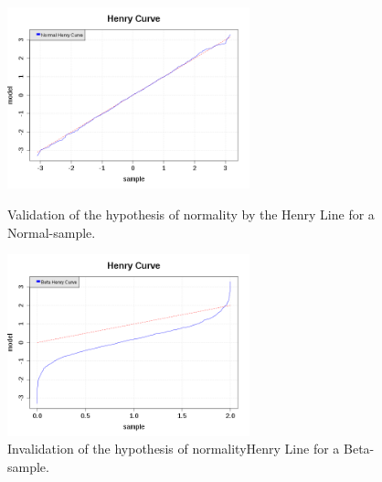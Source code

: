              \begin{figure}[H]
               \begin{minipage}{10cm}
                 \begin{center}
                   \includegraphics[width=7cm]{Figures/HenryLineTestRight.png}
                   \caption{Validation of the hypothesis of normality by the Henry Line for a Normal-sample.}
                   \label{henryLineExRight}
                 \end{center}
               \end{minipage}
               \hfill
               \begin{minipage}{10cm}
                 \begin{center}
                   \includegraphics[width=7cm]{Figures/HenryLineTestFalse.png}
                   \caption{Invalidation of the hypothesis of normalityHenry Line for a Beta-sample.}
                   \label{henryLineExFalse}
                 \end{center}
               \end{minipage}
             \end{figure}
